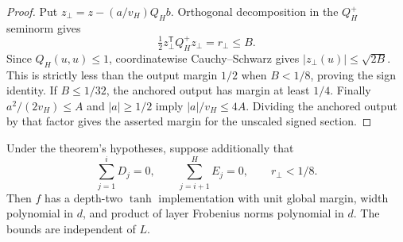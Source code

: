 \begin{proof}
Put $z_\perp=z-(a/v_H)Q_Hb$. Orthogonal decomposition in the
$Q_H^+$ seminorm gives
\[
 \tfrac12z_\perp^{\mathsf T}Q_H^+z_\perp=r_\perp\le B.
\]
Since $Q_H(u,u)\le1$, coordinatewise Cauchy--Schwarz gives
$|z_\perp(u)|\le\sqrt{2B}$. This is strictly less than the output
margin $1/2$ when $B<1/8$, proving the sign identity. If $B\le1/32$,
the anchored output has margin at least $1/4$. Finally
$a^2/(2v_H)\le A$ and $|a|\ge1/2$ imply
$|a|/v_H\le4A$. Dividing the anchored output by that factor gives
the asserted margin for the unscaled signed section.
\end{proof}

\begin{proposition}
\label{prop:critical-zero-directional-entropy}
Under the theorem's hypotheses, suppose additionally that
\[
 \sum_{j=1}^iD_j=0,\qquad
 \sum_{j=i+1}^H E_j=0,\qquad r_\perp<1/8.
\]
Then $f$ has a depth-two $\tanh$ implementation with unit global
margin, width polynomial in $d$, and product of layer Frobenius
norms polynomial in $d$. The bounds are independent of $L$.
\end{proposition}

